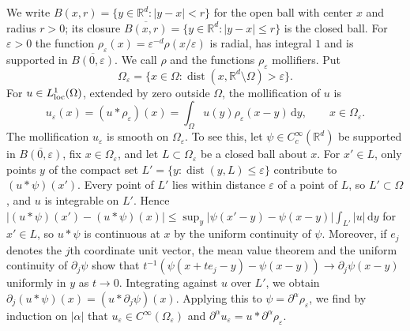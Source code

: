 We write $B(x,r)=\{y\in\mathbb R^d:|y-x|<r\}$ for the open ball with center $x$ and radius $r>0$; its closure $\overline{B(x,r)}=\{y\in\mathbb R^d:|y-x|\leq r\}$ is the closed ball. For $\varepsilon>0$ the function $\rho_\varepsilon(x)=\varepsilon^{-d}\rho(x/\varepsilon)$ is radial, has integral $1$ and is supported in $\overline{B(0,\varepsilon)}$. We call $\rho$ and the functions $\rho_\varepsilon$ mollifiers. Put
\[
 \Omega_\varepsilon=\{x\in\Omega:\operatorname{dist}(x,\mathbb R^d\setminus\Omega)>\varepsilon\}.
\]
For $u\in L^1_{\mathrm{loc}}(\Omega)$, extended by zero outside $\Omega$, the mollification of $u$ is
\[
 u_\varepsilon(x)=(u*\rho_\varepsilon)(x)=\int_\Omega u(y)\rho_\varepsilon(x-y)\,\mathrm d y,\qquad x\in\Omega_\varepsilon.
\]
The mollification $u_\varepsilon$ is smooth on $\Omega_\varepsilon$. To see this, let $\psi\in C_c^\infty(\mathbb R^d)$ be supported in $\overline{B(0,\varepsilon)}$, fix $x\in\Omega_\varepsilon$, and let $L\subset\Omega_\varepsilon$ be a closed ball about $x$. For $x'\in L$, only points $y$ of the compact set $L'=\{y:\operatorname{dist}(y,L)\leq\varepsilon\}$ contribute to $(u*\psi)(x')$. Every point of $L'$ lies within distance $\varepsilon$ of a point of $L$, so $L'\subset\Omega$, and $u$ is integrable on $L'$. Hence $|(u*\psi)(x')-(u*\psi)(x)|\leq\sup_y|\psi(x'-y)-\psi(x-y)|\int_{L'}|u|\,\mathrm dy$ for $x'\in L$, so $u*\psi$ is continuous at $x$ by the uniform continuity of $\psi$. Moreover, if $e_j$ denotes the $j$th coordinate unit vector, the mean value theorem and the uniform continuity of $\partial_j\psi$ show that $t^{-1}(\psi(x+te_j-y)-\psi(x-y))\to\partial_j\psi(x-y)$ uniformly in $y$ as $t\to0$. Integrating against $u$ over $L'$, we obtain $\partial_j(u*\psi)(x)=(u*\partial_j\psi)(x)$. Applying this to $\psi=\partial^\alpha\rho_\varepsilon$, we find by induction on $|\alpha|$ that $u_\varepsilon\in C^\infty(\Omega_\varepsilon)$ and $\partial^\alpha u_\varepsilon=u*\partial^\alpha\rho_\varepsilon$.

